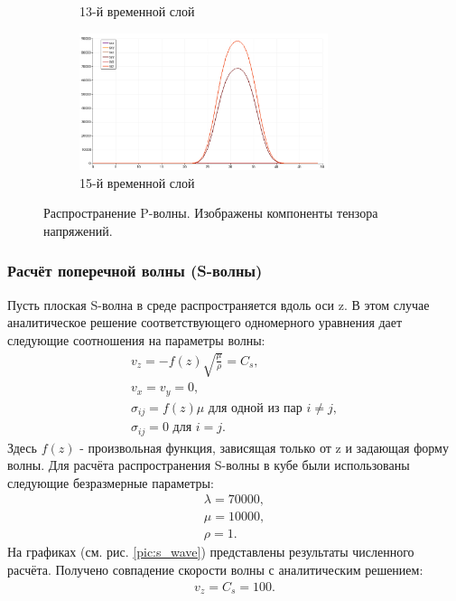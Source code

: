 \begin{figure}[htp]
\begin{subfigure}[b]{0.5\textwidth}
\caption{13-й временной слой}
\end{subfigure}
\begin{subfigure}[b]{0.5\textwidth}
\centering
\includegraphics[width=0.8\textwidth]{png/p-wave-test/s/0015.png}
\caption{15-й временной слой}
\end{subfigure}
\caption{Распространение P-волны. Изображены компоненты тензора напряжений.}
\label{pic:p_wave}
\end{figure}


\subsubsection{Расчёт поперечной волны (S-волны)}
Пусть плоская S-волна в среде распространяется вдоль оси z. В этом случае аналитическое решение соответствующего одномерного уравнения дает следующие соотношения на параметры волны:
\begin{eqnarray}
v_z=-f(z)\sqrt{\frac{\mu}{\rho}}=C_s, \\
v_x=v_y=0, \\
\sigma_{ij}=f(z)\mu \textrm{ для одной из пар } i \neq j, \\
\sigma_{ij}=0 \textrm{ для } i = j.
\end{eqnarray}
Здесь $f(z)$ - произвольная функция, зависящая только от z и задающая форму волны.
Для расчёта распространения S-волны в кубе были использованы следующие безразмерные параметры: 
\begin{eqnarray}
\lambda=70000, \\
\mu=10000, \\
\rho=1.
\end{eqnarray}
На графиках (см. рис. \ref{pic:s_wave}) представлены результаты численного расчёта. Получено совпадение скорости волны с аналитическим решением:
\begin{eqnarray}
v_z=C_s=100.
\end{eqnarray}

